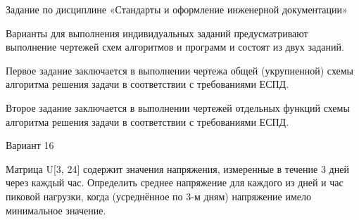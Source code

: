 Задание по дисциплине «Стандарты и оформление инженерной документации»

Варианты для выполнения индивидуальных заданий предусматривают выполнение чертежей схем алгоритмов и программ и состоят из двух заданий.

Первое задание заключается в выполнении чертежа общей (укрупненной) схемы алгоритма решения задачи в соответствии с требованиями ЕСПД.

Второе задание заключается в выполнении чертежей отдельных функций схемы алгоритма решения задачи в соответствии с требованиями ЕСПД.

Вариант 16

Матрица U[3, 24] содержит значения напряжения, измеренные в течение 3 дней через каждый час. Определить среднее напряжение для каждого из дней и час пиковой нагрузки, когда (усреднённое по 3-м дням) напряжение имело минимальное значение.
